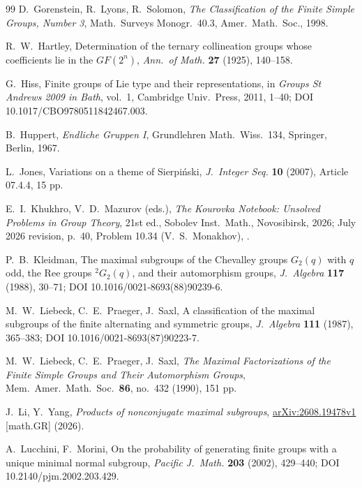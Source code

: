 \documentclass[11pt]{amsart}
\theoremstyle{definition}
\theoremstyle{remark}
\begin{document}
\begin{thebibliography}{99}
D.~Gorenstein, R.~Lyons, R.~Solomon, \emph{The Classification of the
Finite Simple Groups, Number 3}, Math.\ Surveys Monogr.\ 40.3, Amer.\
Math.\ Soc., 1998.

R.~W.~Hartley, Determination of the ternary collineation groups whose
coefficients lie in the $GF(2^n)$, \emph{Ann.\ of Math.} \textbf{27}
(1925), 140--158.

G.~Hiss, Finite groups of Lie type and their representations, in
\emph{Groups St Andrews 2009 in Bath}, vol.~1, Cambridge Univ.\ Press,
2011, 1--40; DOI 10.1017/CBO9780511842467.003.

B.~Huppert, \emph{Endliche Gruppen I}, Grundlehren Math.\ Wiss.\ 134,
Springer, Berlin, 1967.

L.~Jones, Variations on a theme of Sierpi\'nski,
\emph{J.\ Integer Seq.} \textbf{10} (2007), Article 07.4.4, 15 pp.

E.~I.~Khukhro, V.~D.~Mazurov (eds.), \emph{The Kourovka Notebook:
Unsolved Problems in Group Theory}, 21st ed., Sobolev Inst.\ Math.,
Novosibirsk, 2026; July 2026 revision, p.~40, Problem 10.34
(V.~S.~Monakhov),
.

P.~B.~Kleidman, The maximal subgroups of the Chevalley groups $G_2(q)$
with $q$ odd, the Ree groups ${}^2G_2(q)$, and their automorphism
groups, \emph{J.\ Algebra} \textbf{117} (1988), 30--71;
DOI 10.1016/0021-8693(88)90239-6.

M.~W.~Liebeck, C.~E.~Praeger, J.~Saxl, A classification of the maximal
subgroups of the finite alternating and symmetric groups,
\emph{J.\ Algebra} \textbf{111} (1987), 365--383;
DOI 10.1016/0021-8693(87)90223-7.

M.~W.~Liebeck, C.~E.~Praeger, J.~Saxl, \emph{The Maximal Factorizations
of the Finite Simple Groups and Their Automorphism Groups}, Mem.\ Amer.\
Math.\ Soc.\ \textbf{86}, no.~432 (1990), 151 pp.

J.~Li, Y.~Yang, \emph{Products of nonconjugate maximal subgroups},
\href{https://arxiv.org/abs/2608.19478}{arXiv:2608.19478v1} [math.GR] (2026).

\bibitem{LucchiniMorini2002}
A.~Lucchini, F.~Morini, On the probability of generating finite groups
with a unique minimal normal subgroup, \emph{Pacific J.\ Math.}
\textbf{203} (2002), 429--440; DOI 10.2140/pjm.2002.203.429.


\end{thebibliography}
\end{document}
